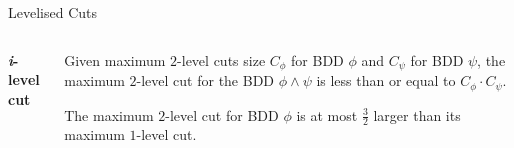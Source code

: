 \documentclass[english, aspectratio=169]{beamer}
\begin{document}
%
%
%
%
\begin{frame}{Levelised Cuts}
  \begin{columns}
    \begin{column}[b]{0.55\textwidth}
      \begin{center}
        \textbf{\LARGE \emph{i}-level cut}
      \end{center}

      \begin{tikzpicture}[scale=0.9]
        
      \end{tikzpicture}
    \end{column}
    \begin{column}[b]{0.44\textwidth}
       {
        \begin{theorem}
          Given maximum $2$-level cuts size $C_{\phi}$ for BDD $\phi$ and
          $C_{\psi}$ for BDD $\psi$, the maximum $2$-level cut for the BDD
          $\phi \land \psi$ is less than or equal to $C_{\phi} \cdot C_{\psi}$.
        \end{theorem}
      }

       {
        \begin{lemma}
          The maximum $2$-level cut for BDD $\phi$ is at most $\tfrac{3}{2}$
          larger than its maximum $1$-level cut.
        \end{lemma}
      }
    \end{column}
  \end{columns}
\end{frame}
\end{document}
